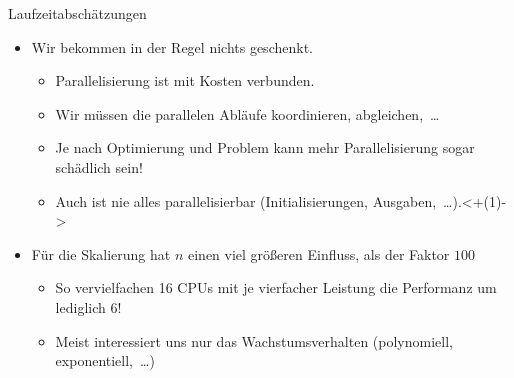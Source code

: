 {\iffull
{\AddonFrame
\begin{frame}{Laufzeitabschätzungen}
    \begin{itemize}[<+(1)->]
        \itemsep17pt
        \item Wir bekommen in der Regel  nichts geschenkt.
        \begin{itemize}
            \itemsep3.5pt
            \item Parallelisierung ist mit Kosten verbunden.
            \item Wir müssen die parallelen Abläufe koordinieren, abgleichen,~\ldots
            \item Je nach Optimierung und Problem kann mehr Parallelisierung sogar schädlich sein!
            \item Auch ist nie alles parallelisierbar (Initialisierungen, Ausgaben,~\ldots).\onslide<+(1)->{}
        \end{itemize}
        \item Für die Skalierung hat \(n\)\raisebox{3pt}{\scriptsize2} einen viel größeren Einfluss, als der Faktor \(100\) \begin{itemize}
            \itemsep3.5pt
            \item So vervielfachen 16 CPUs mit je vierfacher Leistung die Performanz um lediglich \(6\)!
            \item Meist interessiert uns nur das Wachstumsverhalten (polynomiell, exponentiell,~\ldots)
        \end{itemize}
    \end{itemize}
\end{frame}}
\fi
}

